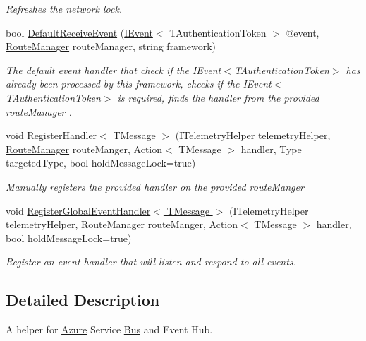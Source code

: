 \begin{DoxyCompactItemize}
\begin{DoxyCompactList}\small\item\em Refreshes the network lock. \end{DoxyCompactList}\item 
bool \hyperlink{interfaceCqrs_1_1Azure_1_1ServiceBus_1_1IAzureBusHelper_a29758e82b2fd6c7e3ed6b19547887db9_a29758e82b2fd6c7e3ed6b19547887db9}{Default\+Receive\+Event} (\hyperlink{interfaceCqrs_1_1Events_1_1IEvent}{I\+Event}$<$ T\+Authentication\+Token $>$ @event, \hyperlink{classCqrs_1_1Bus_1_1RouteManager}{Route\+Manager} route\+Manager, string framework)
\begin{DoxyCompactList}\small\item\em The default event handler that check if the I\+Event$<$\+T\+Authentication\+Token$>$ has already been processed by this framework, checks if the I\+Event$<$\+T\+Authentication\+Token$>$ is required, finds the handler from the provided {\itshape route\+Manager} . \end{DoxyCompactList}\item 
void \hyperlink{interfaceCqrs_1_1Azure_1_1ServiceBus_1_1IAzureBusHelper_a1fe0ff74b4e5cce3d0b5a81dbaa273e0_a1fe0ff74b4e5cce3d0b5a81dbaa273e0}{Register\+Handler$<$ T\+Message $>$} (I\+Telemetry\+Helper telemetry\+Helper, \hyperlink{classCqrs_1_1Bus_1_1RouteManager}{Route\+Manager} route\+Manger, Action$<$ T\+Message $>$ handler, Type targeted\+Type, bool hold\+Message\+Lock=true)
\begin{DoxyCompactList}\small\item\em Manually registers the provided {\itshape handler}  on the provided {\itshape route\+Manger}  \end{DoxyCompactList}\item 
void \hyperlink{interfaceCqrs_1_1Azure_1_1ServiceBus_1_1IAzureBusHelper_aef39e7d297ccaa36b02ccc3012dc5906_aef39e7d297ccaa36b02ccc3012dc5906}{Register\+Global\+Event\+Handler$<$ T\+Message $>$} (I\+Telemetry\+Helper telemetry\+Helper, \hyperlink{classCqrs_1_1Bus_1_1RouteManager}{Route\+Manager} route\+Manger, Action$<$ T\+Message $>$ handler, bool hold\+Message\+Lock=true)
\begin{DoxyCompactList}\small\item\em Register an event handler that will listen and respond to all events. \end{DoxyCompactList}\end{DoxyCompactItemize}


\subsection{Detailed Description}
A helper for \hyperlink{namespaceCqrs_1_1Azure}{Azure} Service \hyperlink{namespaceCqrs_1_1Bus}{Bus} and Event Hub. 


